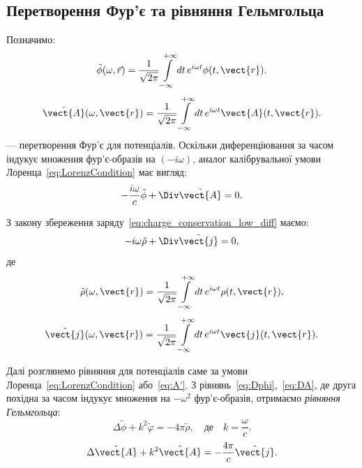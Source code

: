 \subsection*{Перетворення Фур’є та рівняння Гельмгольца}

Позначимо:
\begin{equation}\label{eq:tilde_phi}
	\tilde{\phi}(\omega, \vec{r}) = \frac{1}{\sqrt{2\pi}} \int\limits_{-\infty}^{+\infty} dt \, e^{i \omega t} \phi(t, \vect{r}).
\end{equation}
\begin{equation}\label{eq:tilde_A}
	\tilde{\vect{A}}(\omega, \vect{r}) = \frac{1}{\sqrt{2\pi}} \int\limits_{-\infty}^{+\infty} dt \, e^{i \omega t} \vect{A}(t, \vect{r}).
\end{equation}
--- перетворення Фур’є для потенціалів.
Оскільки диференціювання за часом індукує множення фур’є-образів на \((-i \omega)\), аналог калібрувальної умови Лоренца~\eqref{eq:LorenzCondition} має
вигляд:
\begin{equation}
	-\frac{i \omega}{c} \tilde{\phi} + \Div \tilde{\vect{A}} = 0.
\end{equation}

З закону збереження заряду~\eqref{eq:charge_conservation_low_diff} маємо:
\begin{equation}
	-i \omega \tilde{\rho} + \Div \tilde{\vect{j}} = 0,
\end{equation}
де
\begin{equation}
	\tilde{\rho}(\omega, \vect{r}) = \frac{1}{\sqrt{2\pi}} \int\limits_{-\infty}^{+\infty} dt \, e^{i \omega t} \rho(t, \vect{r}),
\end{equation}
\begin{equation}
	\tilde{\vect{j}}(\omega, \vect{r}) = \frac{1}{\sqrt{2\pi}} \int\limits_{-\infty}^{+\infty} dt \, e^{i \omega t} \vect{j}(t, \vect{r}).
\end{equation}

Далі розглянемо рівняння для потенціалів саме за умови Лоренца~\eqref{eq:LorenzCondition} або~\eqref{eq:A'}. З рівнянь~\eqref{eq:Dphi},~\eqref{eq:DA},
де друга похідна за часом індукує множення на \( -\omega^2 \) фур’є-образів, отримаємо \emph{рівняння Гельмгольца}:
\begin{equation}\label{eq:Dphi_Fourier}
	\Delta \tilde{\phi} + k^2 \tilde{\varphi} = -4\pi \tilde{\rho}, \quad \text{де} \quad k = \frac{\omega}{c}.
\end{equation}
\begin{equation}\label{eq:DA_Fourier}
	\Delta \tilde{\vect{A}} + k^2 \tilde{\vect{A}} = -\frac{4\pi}{c} \tilde{\vect{j}}.
\end{equation}



